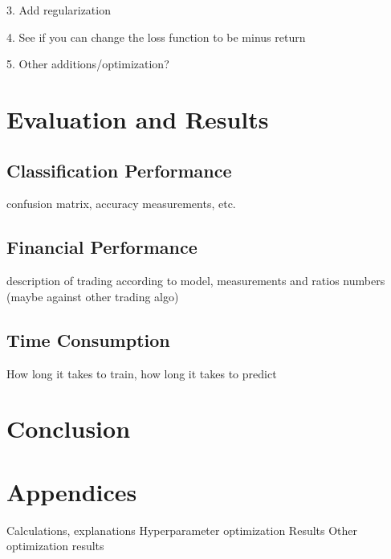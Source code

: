 \documentclass[11pt, a4paper]{article}
\begin{document}
3. Add regularization

4. See if you can change the loss function to be minus return

5. Other additions/optimization?

\section{Evaluation and Results}

\subsection{Classification Performance}
confusion matrix, accuracy measurements, etc.

\subsection{Financial Performance}
description of trading according to model, measurements and ratios
numbers (maybe against other trading algo)

\subsection{Time Consumption}
How long it takes to train, how long it takes to predict

\section{Conclusion}

\section{Appendices}
Calculations, explanations
Hyperparameter optimization Results
Other optimization results



\end{document}
